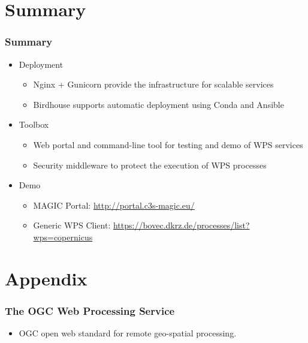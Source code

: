 \documentclass{beamer}
\begin{document}
\section{Summary}

\begin{frame}
\frametitle<presentation>{Summary}

\begin{itemize}

  \item Deployment
  \begin{itemize}
    \item Nginx + Gunicorn provide the infrastructure for scalable services
    \item Birdhouse supports automatic deployment using Conda and Ansible
  \end{itemize}

  \item{Toolbox}
  \begin{itemize}
    \item Web portal and command-line tool for testing and demo of WPS services
    \item Security middleware to protect the execution of WPS processes
  \end{itemize}

  \item{Demo}
  \begin{itemize}
    \item MAGIC Portal: \url{http://portal.c3s-magic.eu/}
    \item Generic WPS Client: \url{https://bovec.dkrz.de/processes/list?wps=copernicus}
  \end{itemize}
\end{itemize}

\end{frame}

\appendix

\section{Appendix}

\begin{frame}
\frametitle<presentation>{The OGC Web Processing Service}

  \begin{itemize}
    \item OGC open web standard for remote geo-spatial processing.
  \end{itemize}
\end{frame}
\end{document}
